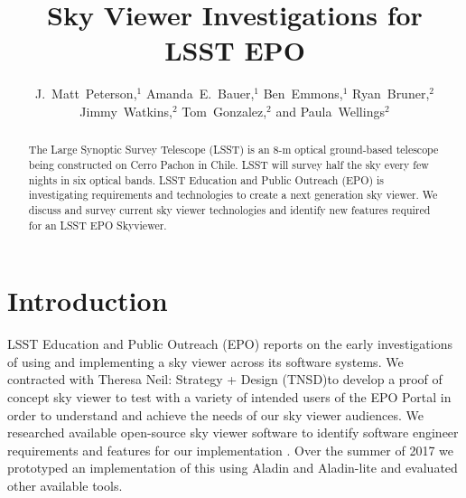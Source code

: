 \documentclass[11pt,twoside]{article}
\begin{document}
\title{Sky Viewer Investigations for LSST EPO}

\author{J.~Matt~Peterson,$^1$ Amanda~E.~Bauer,$^1$ Ben~Emmons,$^1$ Ryan~Bruner,$^2$ Jimmy~Watkins,$^2$ Tom~Gonzalez,$^2$ and Paula~Wellings$^2$}


\begin{abstract}
The Large Synoptic Survey Telescope (LSST) is an 8-m optical ground-based telescope being constructed on Cerro Pachon in Chile. LSST will survey half the sky every few nights in six optical bands. LSST Education and Public Outreach (EPO) is investigating requirements and technologies to create a next generation sky viewer. We discuss and survey current sky viewer technologies and identify new features required for an LSST EPO Skyviewer.
\end{abstract}

\section{Introduction}
LSST Education and Public Outreach (EPO) reports on the early investigations of using and implementing a sky viewer across its software systems. We contracted with Theresa Neil: Strategy + Design (TNSD)\footnotemark[1] to develop a proof of concept sky viewer to test with a variety of intended users of the EPO Portal in order to understand and achieve the needs of our sky viewer audiences. We researched available open-source sky viewer software to identify software engineer requirements and features for our implementation \citep{2017LSST.1.LEP-31}. Over the summer of 2017 we prototyped an implementation of this using Aladin and Aladin-lite \citep{2014ASPC..485..277B} and evaluated other available tools.
\end{document}
